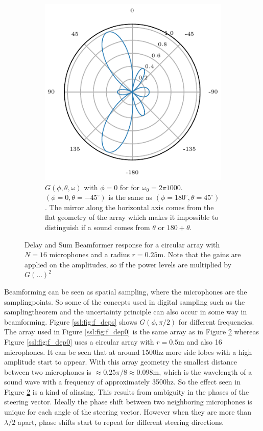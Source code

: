 \begin{figure}[h]
\begin{subfigure}[t]{0.45\textwidth}
		\includegraphics[width=\textwidth]{radial_1200_circ_theta_single.pdf}
		\caption{\(G(\phi, \theta, \omega)\) with $\phi = 0$ for for $\omega_0 = 2\pi 1000$. 
		$(\phi= 0, \theta = -45^\circ)$ is the same as $(\phi= 180^\circ, \theta = 45^\circ)$.
		The mirror along the horizontal axis comes from the flat geometry of the array which makes
		it impossible to distinguish if a sound comes from $\theta$ or $180 + \theta$.} 
		\label{ssl:fig:CircBmTheta}
	\end{subfigure}
	\caption{Delay and Sum Beamformer response for a circular array with $N=16$ microphones 
	and a radius $r = 0.25$m. Note that the gains are applied on the amplitudes, so if the 
	power levels are multiplied by $G(\dots)^2$}
	\label{ssl:fig:CircBmResponse}
\end{figure}

Beamforming can be seen as spatial sampling, where the microphones
are the samplingpoints.
So some of the concepts used in digital sampling such as 
the samplingtheorem and the uncertainty principle can also 
occur in some way in beamforming.
Figure \ref{ssl:fig:f_deps} shows $G(\phi, \pi/2)$ for different frequencies.
The array used in Figure \ref{ssl:fig:f_dep0} is the same array
as in Figure \ref*{ssl:fig:CircBmResponse} whereas Figure \ref{ssl:fig:f_dep0}
uses a circular array with $r = 0.5$m and also 16 microphones. 
It can be seen that at around 1500hz more side lobes with a 
high amplitude start to appear. 
With this array geometry the smallest distance between two 
microphones is $\approx 0.25 \pi/8 \approx 0.098$m, which is the wavelength
of a sound wave with a frequency of approximately 3500hz.
So the effect seen in Figure \ref*{ssl:fig:CircBmResponse} is 
a kind of aliasing.
This results from ambiguity in the phases of the steering vector.
Ideally the phase shift between two neighboring microphones is unique
for each angle of the steering vector. 
However when they are more than $\lambda/2$ apart, phase shifts start to 
repeat for different steering directions.


